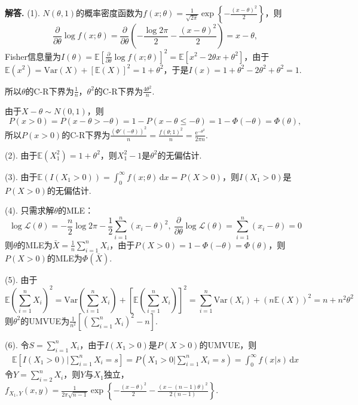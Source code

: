 \documentclass[12pt, a4paper, oneside]{ctexart}
\newenvironment{solution}[1][]{\par\noindent\textbf{#1解答. }}{\smallskip\par}  %
\let\leq=\leqslant %
\def\E{\mathbb{E}}          %
\def\var{\text{Var}}        %
\def\d{\mathrm{d}}          %
\def\e{\mathrm{e}}          %
\def\L{\mathcal{L}}         %
\def\add{\vspace{1ex}}      %
\begin{document}
\begin{solution}
    (1). $N(\theta,1)$的概率密度函数为$f(x;\theta) = \frac{1}{\sqrt{2\pi}}\exp\left\{-\frac{(x-\theta)^2}{2}\right\}$，则
    \begin{equation*}
        \frac{\partial}{\partial\theta}\log f(x;\theta) = \frac{\partial}{\partial\theta}\left(-\frac{\log 2\pi}{2}-\frac{(x-\theta)^2}{2}\right) = x-\theta,
    \end{equation*}
    Fisher信息量为$I(\theta) = \E\left[\frac{\partial}{\partial\theta}\log f(x;\theta)\right]^2 = \E[x^2-2\theta x+\theta^2]$，\add 由于$\E(x^2) = \var(X) + [\E(X)]^2 = 1+\theta^2$，于是$I(x) = 1+\theta^2-2\theta^2+\theta^2 =1$.

    所以$\theta$的C-R下界为$\frac{1}{n}$，$\theta^2$的C-R下界为$\frac{4\theta^2}{n}$.
    
    由于$X-\theta\sim N(0,1)$，则
    \begin{equation*}
        P(x>0) = P(x-\theta > -\theta) = 1-P(x-\theta\leq -\theta) = 1-\Phi(-\theta)=\Phi(\theta),
    \end{equation*}
    所以$P(x > 0)$的C-R下界为$\frac{\left(\Phi'(-\theta)\right)^2}{n} = \frac{f(\theta;1)^2}{n} = \frac{\e^{-\theta^2}}{2\pi n}$.\add

    (2). 由于$\E(X_1^2) = 1+\theta^2$，则$X_1^2-1$是$\theta^2$的无偏估计.

    (3). 由于$\E(I(X_1 > 0)) = \int_0^\infty f(x;\theta)\,\d x = P(X>0)$，则$I(X_1>0)$是$P(X>0)$的无偏估计.

    (4). 只需求解$\theta$的MLE：
    \begin{equation*}
        \log\L(\theta) = -\frac{n}{2}\log 2\pi-\frac{1}{2}\sum_{i=1}^n(x_i-\theta)^2,\ \frac{\partial}{\partial\theta}\log\L(\theta) = \sum_{i=1}^n(x_i-\theta) = 0
    \end{equation*}
    则$\theta$的MLE为$\bar{X} = \frac{1}{n}\sum_{i=1}^nX_i$，由于$P(X>0) = 1-\Phi(-\theta)=\Phi(\theta)$，则$P(X>0)$的MLE为$\Phi(\bar{X})$.

    (5). 由于
    \begin{equation*}
        \E\left(\sum_{i=1}^nX_i\right)^2 = \var\left(\sum_{i=1}^nX_i\right)+\left[\E\left(\sum_{i=1}^nX_i\right)\right]^2 = \sum_{i=1}^n\var(X_i)+(n\E(X))^2 = n+n^2\theta^2
    \end{equation*}
   则$\theta^2$的UMVUE为$\frac{1}{n^2}\left[\left(\sum_{i=1}^nX_i\right)^2-n\right]$.\add

    (6). 令$S  = \sum_{i=1}^nX_i$，由于$I(X_1>0)$是$P(X>0)$的UMVUE，则
    \begin{align*}
        \E\left[I(X_1>0)\biggl|\sum_{i=1}^nX_i=s\right] = P(X_1>0|\sum_{i=1}^nX_i=s) = \int_0^\infty f(x|s)\,\d x
    \end{align*}
    令$Y = \sum_{i=2}^nX_i$，则$Y$与$X_1$独立，$f_{X_1,Y}(x,y) = \frac{1}{2\pi\sqrt{n-1}}\exp\left\{-\frac{(x-\theta)^2}{2}-\frac{(x-(n-1)\theta)^2}{2(n-1)}\right\}$.\add


\end{solution}
\end{document}
